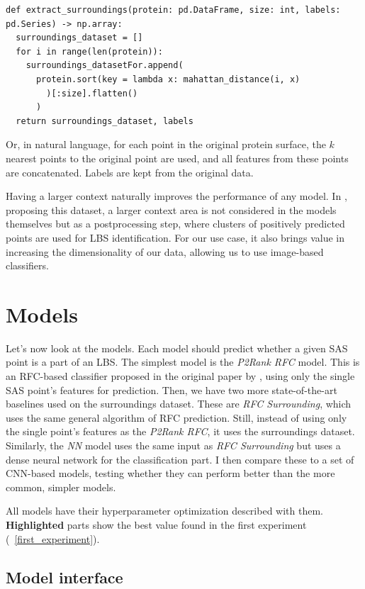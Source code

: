 \begin{lstlisting}
def extract_surroundings(protein: pd.DataFrame, size: int, labels: pd.Series) -> np.array:
  surroundings_dataset = []
  for i in range(len(protein)):
    surroundings_datasetFor.append(
      protein.sort(key = lambda x: mahattan_distance(i, x)
        )[:size].flatten()
      )
  return surroundings_dataset, labels
\end{lstlisting}

Or, in natural language, for each point in the original protein surface, the $k$ nearest points to the original point are used, and all features from these points are concatenated. Labels are kept from the original data.

Having a larger context naturally improves the performance of any model. In \cite{P2RANK}, proposing this dataset, a larger context area is not considered in the models themselves but as a postprocessing step, where clusters of positively predicted points are used for LBS identification. For our use case, it also brings value in increasing the dimensionality of our data, allowing us to use image-based classifiers.

\section{Models}

Let's now look at the models. Each model should predict whether a given SAS point is a part of an LBS. The simplest model is the \textit{P2Rank RFC} model. This is an RFC-based classifier proposed in the original paper by \cite{P2RANK}, using only the single SAS point's features for prediction. Then, we have two more state-of-the-art baselines used on the surroundings dataset. These are \textit{RFC Surrounding}, which uses the same general algorithm of RFC prediction. Still, instead of using only the single point's features as the \textit{P2Rank RFC}, it uses the surroundings dataset. Similarly, the \textit{NN} model uses the same input as \textit{RFC Surrounding} but uses a dense neural network for the classification part. I then compare these to a set of CNN-based models, testing whether they can perform better than the more common, simpler models.

All models have their hyperparameter optimization described with them. \textbf{Highlighted} parts show the best value found in the first experiment (~\ref{first_experiment}).

\subsection{Model interface}

